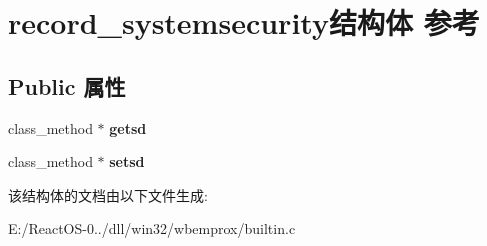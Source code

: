 \hypertarget{structrecord__systemsecurity}{}\section{record\+\_\+systemsecurity结构体 参考}
\label{structrecord__systemsecurity}
\subsection*{Public 属性}
\begin{DoxyCompactItemize}
\item 
\mbox{\label{structrecord__systemsecurity_adc71b58f33c84f33c506c720cf3a97ed}} 
class\+\_\+method $\ast$ {\bfseries getsd}
\item 
\mbox{\label{structrecord__systemsecurity_a4f66df50a5880e5fc0fe8e8d826c5d4b}} 
class\+\_\+method $\ast$ {\bfseries setsd}
\end{DoxyCompactItemize}


该结构体的文档由以下文件生成\+:\begin{DoxyCompactItemize}
\item 
E\+:/\+React\+O\+S-\/0../dll/win32/wbemprox/builtin.\+c\end{DoxyCompactItemize}
